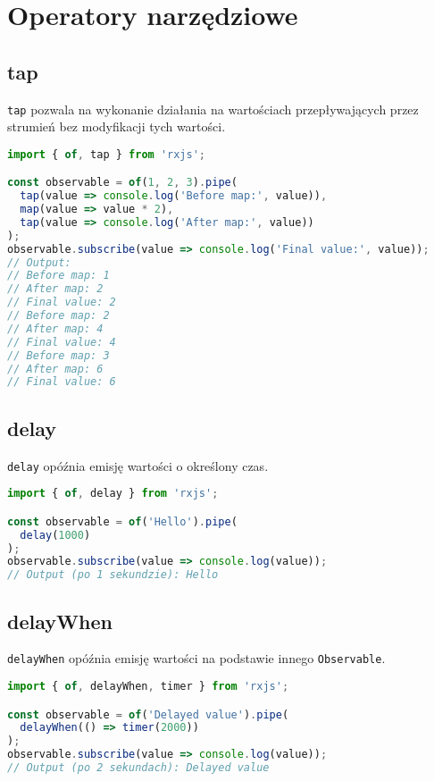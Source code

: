\documentclass[a4paper,12pt]{article}
\begin{document}
\section{Operatory narzędziowe}
\subsection{tap}
\texttt{tap} pozwala na wykonanie działania na wartościach przepływających przez strumień bez modyfikacji tych wartości.

\begin{lstlisting}[language=JavaScript, caption=Przykład użycia \texttt{tap}]
import { of, tap } from 'rxjs';

const observable = of(1, 2, 3).pipe(
  tap(value => console.log('Before map:', value)),
  map(value => value * 2),
  tap(value => console.log('After map:', value))
);
observable.subscribe(value => console.log('Final value:', value));
// Output:
// Before map: 1
// After map: 2
// Final value: 2
// Before map: 2
// After map: 4
// Final value: 4
// Before map: 3
// After map: 6
// Final value: 6
\end{lstlisting}

\subsection{delay}
\texttt{delay} opóźnia emisję wartości o określony czas.

\begin{lstlisting}[language=JavaScript, caption=Przykład użycia \texttt{delay}]
import { of, delay } from 'rxjs';

const observable = of('Hello').pipe(
  delay(1000)
);
observable.subscribe(value => console.log(value));
// Output (po 1 sekundzie): Hello
\end{lstlisting}

\subsection{delayWhen}
\texttt{delayWhen} opóźnia emisję wartości na podstawie innego \texttt{Observable}.

\begin{lstlisting}[language=JavaScript, caption=Przykład użycia \texttt{delayWhen}]
import { of, delayWhen, timer } from 'rxjs';

const observable = of('Delayed value').pipe(
  delayWhen(() => timer(2000))
);
observable.subscribe(value => console.log(value));
// Output (po 2 sekundach): Delayed value
\end{lstlisting}
\end{document}
